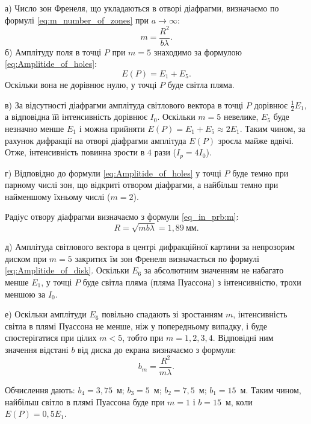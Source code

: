\begin{solutionexample}
    а) Число зон Френеля, що укладаються в отворі діафрагми,
    визначаємо по формулі \eqref{eq:m_number_of_zones} при $a \to\infty$:
    \begin{equation}\label{eq_in_prb:m}
        m = \frac{R^2}{b\lambda}.
    \end{equation}
    б) Амплітуду поля в точці $P$ при $m = 5$ знаходимо за формулою \eqref{eq:Amplitide_of_holes}:
    \begin{equation*}
        E(P) = E_1 + E_5.
    \end{equation*}
    Оскільки вона не дорівнює нулю, у точці $ P $ буде світла пляма.

    в) За відсутності діафрагми амплітуда світлового вектора в точці $ P $ дорівнює $ \frac12 E_1 $, а відповідна їй інтенсивність дорівнює $ I_0 $. Оскільки $ m = 5 $ невелике, $ E_5 $ буде незначно менше $ E_1 $ і можна прийняти $ E(P) = E_1 + E_5 \approx 2 E_1 $. Таким чином, за рахунок дифракції на отворі діафрагми амплітуда $ E(P) $ зросла майже вдвічі. Отже, інтенсивність повинна зрости в $ 4 $ рази ($ I_p = 4I_0$).

    г) Відповідно до формули \eqref{eq:Amplitide_of_holes} у точці $ P $ буде темно при парному числі зон, що відкриті отвором діафрагми, а найбільш темно
    при найменшому їхньому числі ($ m = 2 $).

    Радіус отвору діафрагми визначаємо з формули \eqref{eq_in_prb:m}:
    \begin{equation*}
        R = \sqrt{mb\lambda} = 1,89\ \text{мм}.
    \end{equation*}

    д) Амплітуда світлового вектора в центрі дифракційної картини за непрозорим диском при $ m = 5 $ закритих їм зон Френеля визначається по формулі \eqref{eq:Amplitide_of_disk}. Оскільки $ E_6 $ за абсолютним значенням не набагато менше $ E_1 $, у точці $ P $ буде світла пляма (пляма Пуассона) з інтенсивністю, трохи меншою за $ I_0 $.


    е) Оскільки амплітуди $ E_6 $ повільно спадають зі зростанням $ m $,
    інтенсивність світла в плямі Пуассона не менше, ніж у попередньому
    випадку, і буде спостерігатися при цілих $ m < 5 $, тобто при $ m = 1, 2, 3, 4 $. Відповідні ним значення відстані $ b $ від диска до екрана
    визначаємо з формули:
    \begin{equation*}
        b_m = \frac{R^2}{m\lambda}.
    \end{equation*}

    Обчислення дають: $ b_4 = 3,75 $~м; $ b_3 = 5 $~м; $ b_2 = 7,5 $~м; $ b_1 = 15 $~м.
    Таким чином, найбільш світло в плямі Пуассона буде при $ m = 1 $ і $ b = 15 $~м, коли $ E(P) = 0,5E_1 $.
    \end{solutionexample}


